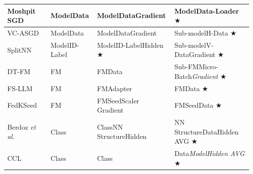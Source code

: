 \begin{table}[t]
\begin{tabular}{|l|p{2.6cm}|p{4cm}|p{5cm}|}
    Moshpit SGD~\cite{ryabinin2021moshpit} & \colorbox{Employer!30}{Model}\colorbox{Employer!30}{Data} & \colorbox{Employer!30}{Model}\colorbox{Employer!30}{Data}\colorbox{Worker!30}{Gradient} & \colorbox{Employer!30}{Model}\colorbox{Employer!30}{Data-Loader} $\bigstar$ \\ \hline 

    VC-ASGD~\cite{atre2021distributed} & \colorbox{Employer!30}{Model}\colorbox{Employer!30}{Data} & \colorbox{Employer!30}{Model}\colorbox{Employer!30}{Data}\colorbox{Worker!30}{Gradient} & \colorbox{Employer!30}{Sub-model}\colorbox{Employer!30}{H-Data} $\bigstar$ \\ \hline

    SplitNN~\cite{vepakomma2019split} & \colorbox{Employer!30}{Model}\colorbox{Employer!30}{ID-Label} & \colorbox{Employer!30}{Model}\colorbox{Employer!30}{ID-Label}\colorbox{Worker!30}{Hidden} $\bigstar$ & \colorbox{Employer!30}{Sub-model}\colorbox{Worker!30}{V-Data}\colorbox{Platform!30}{Gradient} $\bigstar$ \\ \hline
    
    DT-FM~\cite{yuan2022decentralized} & \colorbox{Employer!30}{FM} & \colorbox{Employer!30}{FM}\colorbox{Platform!30}{Data} & \colorbox{Employer!30}{Sub-FM}\colorbox{Platform!30}{Micro-Batch}\colorbox{Worker!30}{\textit{Gradient}} $\bigstar$ \\ \hline

    FS-LLM~\cite{kuang2023federatedscope} & \colorbox{Employer!30}{FM} & \colorbox{Employer!30}{FM}\colorbox{Worker!30}{Adapter} & \colorbox{Employer!30}{FM}\colorbox{Worker!30}{Data} $\bigstar$ \\ \hline

    FedKSeed~\cite{qin2023federated} & \colorbox{Employer!30}{FM} & \colorbox{Employer!30}{FM}\colorbox{Platform!30}{Seed}\colorbox{Worker!30}{Scaler Gradient} & \colorbox{Employer!30}{FM}\colorbox{Platform!30}{Seed}\colorbox{Worker!30}{Data} $\bigstar$ \\ \hline

    Berdoz \textit{et al.}~\cite{berdoz2022scalable} & \colorbox{Employer!30}{Class} & \colorbox{Employer!30}{Class}\colorbox{Platform!30}{NN Structure}\colorbox{Worker!30}{Hidden} & \colorbox{Platform!30}{NN Structure}\colorbox{Worker!30}{Data}\colorbox{Platform!30}{Hidden AVG} $\bigstar$ \\ \hline

    CCL~\cite{aketi2024cross} & \colorbox{Employer!30}{Class} & \colorbox{Employer!30}{Class} & \colorbox{Worker!30}{Data}\colorbox{Worker!30}{\textit{Model}}\colorbox{Worker!30}{\textit{Hidden AVG}} $\bigstar$ \\ \hline


\end{tabular}
\end{table}
